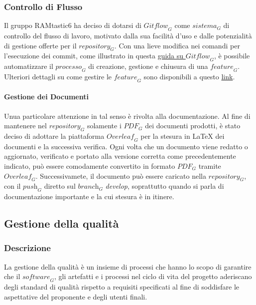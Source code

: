 \subsubsection{Controllo di Flusso}
Il gruppo RAMtastic6 ha deciso di dotarsi di $\textit{Gitflow}_G$ come $\textit{sistema}_G$ di controllo del flusso di lavoro, motivato dalla sua facilità d'uso e dalle potenzialità di gestione offerte per il $\textit{repository}_G$. Con una lieve modifica nei comandi per l'esecuzione dei commit, come illustrato in questa \href{https://www.atlassian.com/git/tutorials/comparing-workflows/gitflow-workflow}{guida su $\textit{Gitflow}_G$}, è possibile automatizzare il $\textit{processo}_G$ di creazione, gestione e chiusura di una $\textit{feature}_G$. Ulteriori dettagli su come gestire le $\textit{feature}_G$ sono disponibili a questo \href{http://danielkummer.github.io/git-flow-cheatsheet/}{link}.
\paragraph{Gestione dei Documenti}
Unua particolare attenzione in tal senso è rivolta alla documentazione. Al fine di mantenere nel $\textit{repository}_G$ solamente i $\textit{PDF}_G$ dei documenti prodotti, è stato deciso di adottare la piattaforma \href{https://www.overleaf.com/project}{$\textit{Overleaf}_G$} per la stesura in LaTeX dei documenti e la successiva verifica. Ogni volta che un documento viene redatto o aggiornato, verificato e portato alla versione corretta come precedentemente indicato, può essere comodamente convertito in formato $\textit{PDF}_G$ tramite $\textit{Overleaf}_G$. Successivamete, il documento può essere caricato nella $\textit{repository}_G$, con il $\textit{push}_G$ diretto sul $\textit{branch}_G$ \textit{develop}, soprattutto quando si parla di documentazione importante e la cui stesura è in itinere.
\subsection{Gestione della qualità}
\subsubsection{Descrizione}
La gestione della qualità è un insieme di processi che hanno lo scopo di garantire che il $\textit{software}_G$, gli artefatti e i processi nel ciclo di vita del progetto aderiscano degli standard di qualità rispetto a requisiti specificati al fine di soddisfare le aspettative del proponente e degli utenti finali.
